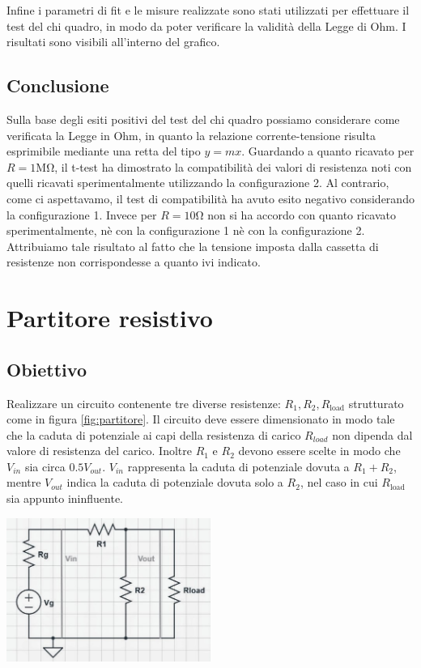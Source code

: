 \documentclass[a4paper]{article}
\begin{document}
Infine i parametri di fit e le misure realizzate sono stati utilizzati per effettuare il test del chi quadro, in modo da poter verificare la validità della Legge di Ohm. I risultati sono visibili all'interno del grafico.


\subsection{Conclusione}
Sulla base degli esiti positivi del test del chi quadro possiamo considerare come verificata la Legge in Ohm, in quanto la relazione corrente-tensione risulta esprimibile mediante una retta del tipo \(y= mx\).
Guardando a quanto ricavato per \(R=1\si{\mega\ohm}\), il t-test ha dimostrato la compatibilità dei valori di resistenza noti con quelli ricavati sperimentalmente utilizzando la configurazione 2. Al contrario, come ci aspettavamo, il test di compatibilità ha avuto esito negativo considerando la configurazione 1. Invece per \(R = 10\si{\ohm}\) non si ha accordo con quanto ricavato sperimentalmente, nè con la configurazione 1 nè con la configurazione 2. Attribuiamo tale risultato al fatto che la tensione imposta dalla cassetta di resistenze non corrispondesse a quanto ivi indicato.


\section{Partitore resistivo}
\subsection{Obiettivo}
Realizzare un circuito contenente tre diverse resistenze: \emph{$R_1, R_2, R_{\text{load}}$} strutturato come in figura \ref{fig:partitore}.
Il circuito deve essere dimensionato in modo tale che la caduta di potenziale ai capi della resistenza di carico \( \mathit{R_{load}} \) non dipenda dal valore di resistenza del carico.
Inoltre \( \mathit{R_1} \) e \( \mathit{R_2} \) devono essere scelte in modo che \( \mathit{V_{\text{in}}} \) sia circa \( \mathit{0.5 V_{\text{out}}} \).
\( \mathit{V_{\text{in}}} \) rappresenta la caduta di potenziale dovuta a $R_1 + R_2$, mentre \( \mathit{V_{\text{out}}} \) indica la caduta di potenziale dovuta solo a $R_2$, nel caso in cui $R_{\text{load}}$ sia appunto ininfluente.
\begin{center}
	\includegraphics[width=0.5\textwidth]{grafici/partitore.jpg}
	\label{fig:partitore}
\end{center}
\end{document}
